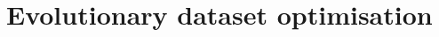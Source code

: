\chapter{Evolutionary dataset optimisation}%
\label{chp:edo}
\graphicspath{{chapters/02/edo-paper/img/}}
